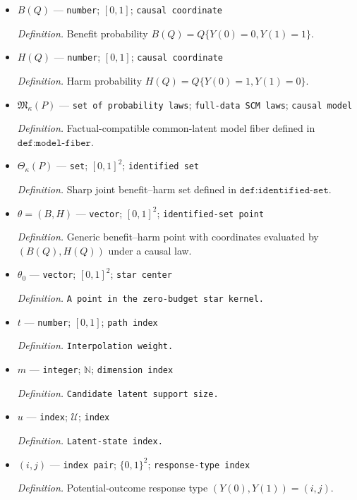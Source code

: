 \documentclass{article}
\begin{document}
\begin{itemize}
  \item \(B(Q)\) --- \texttt{number}; \([0,1]\); \texttt{causal coordinate}
  \par\smallskip\noindent\emph{Definition.} Benefit probability \(B(Q)=Q\{Y(0)=0,Y(1)=1\}\).
  \item \(H(Q)\) --- \texttt{number}; \([0,1]\); \texttt{causal coordinate}
  \par\smallskip\noindent\emph{Definition.} Harm probability \(H(Q)=Q\{Y(0)=1,Y(1)=0\}\).
  \item \(\mathfrak M_\kappa(P)\) --- \texttt{set of probability laws}; \texttt{full-\allowbreak{}data SCM laws}; \texttt{causal model}
  \par\smallskip\noindent\emph{Definition.} Factual-compatible common-latent model fiber defined in \(\texttt{def:model-fiber}\).
  \item \(\Theta_\kappa(P)\) --- \texttt{set}; \([0,1]^2\); \texttt{identified set}
  \par\smallskip\noindent\emph{Definition.} Sharp joint benefit--harm set defined in \(\texttt{def:identified-set}\).
  \item \(\theta=(B,H)\) --- \texttt{vector}; \([0,1]^2\); \texttt{identified-\allowbreak{}set point}
  \par\smallskip\noindent\emph{Definition.} Generic benefit--harm point with coordinates evaluated by \((B(Q),H(Q))\) under a causal law.
  \item \(\theta_0\) --- \texttt{vector}; \([0,1]^2\); \texttt{star center}
  \par\smallskip\noindent\emph{Definition.} \texttt{A point in the zero-\allowbreak{}budget star kernel.}
  \item \(t\) --- \texttt{number}; \([0,1]\); \texttt{path index}
  \par\smallskip\noindent\emph{Definition.} \texttt{Interpolation weight.}
  \item \(m\) --- \texttt{integer}; \(\mathbb N\); \texttt{dimension index}
  \par\smallskip\noindent\emph{Definition.} \texttt{Candidate latent support size.}
  \item \(u\) --- \texttt{index}; \(\mathcal U\); \texttt{index}
  \par\smallskip\noindent\emph{Definition.} \texttt{Latent-\allowbreak{}state index.}
  \item \((i,j)\) --- \texttt{index pair}; \(\{0,1\}^2\); \texttt{response-\allowbreak{}type index}
  \par\smallskip\noindent\emph{Definition.} Potential-outcome response type \((Y(0),Y(1))=(i,j)\).

\end{itemize}
\end{document}

